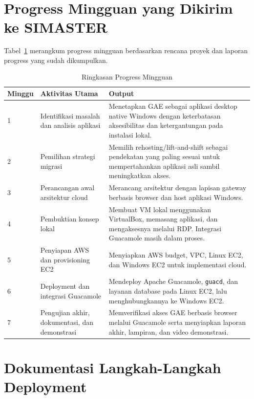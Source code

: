 \documentclass[conference]{IEEEtran}
\begin{document}
\clearpage
\onecolumn
\appendices

\section{Progress Mingguan yang Dikirim ke SIMASTER}

Tabel~\ref{tab:weekly} merangkum progress mingguan berdasarkan rencana proyek dan laporan progress yang sudah dikumpulkan.

\begin{table}[!h]
\centering
\caption{Ringkasan Progress Mingguan}
\label{tab:weekly}
\begin{tabularx}{\textwidth}{p{0.8cm}p{3.5cm}X}
\toprule
\textbf{Minggu} & \textbf{Aktivitas Utama} & \textbf{Output} \\
\midrule
1 & Identifikasi masalah dan analisis aplikasi & Menetapkan GAE sebagai aplikasi desktop native Windows dengan keterbatasan aksesibilitas dan ketergantungan pada instalasi lokal. \\
2 & Pemilihan strategi migrasi & Memilih rehosting/lift-and-shift sebagai pendekatan yang paling sesuai untuk mempertahankan aplikasi asli sambil meningkatkan akses. \\
3 & Perancangan awal arsitektur cloud & Merancang arsitektur dengan lapisan gateway berbasis browser dan host aplikasi Windows. \\
4 & Pembuktian konsep lokal & Membuat VM lokal menggunakan VirtualBox, memasang aplikasi, dan mengaksesnya melalui RDP. Integrasi Guacamole masih dalam proses. \\
5 & Penyiapan AWS dan provisioning EC2 & Menyiapkan AWS budget, VPC, Linux EC2, dan Windows EC2 untuk implementasi cloud. \\
6 & Deployment dan integrasi Guacamole & Mendeploy Apache Guacamole, \texttt{guacd}, dan layanan database pada Linux EC2, lalu menghubungkannya ke Windows EC2. \\
7 & Pengujian akhir, dokumentasi, dan demonstrasi & Memverifikasi akses GAE berbasis browser melalui Guacamole serta menyiapkan laporan akhir, lampiran, dan video demonstrasi. \\
\bottomrule
\end{tabularx}
\end{table}

\section{Dokumentasi Langkah-Langkah Deployment}
\end{document}
